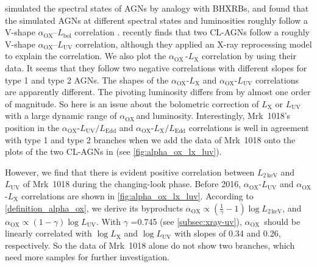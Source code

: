 \documentclass[twocolumn]{aastex63}
\newcommand{\alphaox}{$\alpha_\mathrm{OX}$}
\begin{document}
\citet{2011MNRAS.413.2259S} simulated the spectral states of AGNs by analogy with BHXRBs, and found that the simulated AGNs at different spectral states and luminosities roughly follow a V-shape \alphaox--$L_\mathrm{bol}$ correlation \citep[see also in ][]{2019ApJ...883...76R}. \citet{2019arXiv190904676R} recently finds that two CL-AGNs follow a roughly V-shape \alphaox--$L_\mathrm{UV}$ correlation, although they applied an X-ray reprocessing model to explain the correlation. We also plot the \alphaox\,-$L_\mathrm{X}$ correlation by using their data. It seems that they follow two negative correlations with different slopes for type 1 and type 2 AGNs. The shapes of the \alphaox-$L_\mathrm{X}$ and \alphaox-$L_\mathrm{UV}$ correlations are apparently different. The pivoting luminosity differs from \citet{2011ApJ...739...64X} by almost one order of magnitude. So here is an issue about the bolometric correction of $L_\mathrm{X}$ or $L_\mathrm{UV}$ with a large dynamic range of \alphaox \,and luminosity. Interestingly, Mrk~1018's position in the \alphaox-$L_\mathrm{UV}/L_\mathrm{Edd}$ and \alphaox-$L_\mathrm{X}/L_\mathrm{Edd}$ correlations is well in agreement with type 1 and type 2 branches when we add the data of Mrk~1018 onto the plots of the two CL-AGNs in \citet{2019arXiv190904676R} (see \autoref{fig:alpha_ox_lx_luv}).

However, we find that there is evident positive correlation between $L_\mathrm{2\,keV}$ and $L_\mathrm{UV}$ of Mrk~1018 during the changing-look phase. Before 2016, \alphaox-$L_\mathrm{UV}$ and \alphaox-$L_\mathrm{X}$ correlations are shown in \autoref{fig:alpha_ox_lx_luv}. According to \autoref{definition_alpha_ox}, we derive its byproducts \alphaox $\propto (\frac{1}{\gamma}-1) \log L_\mathrm{2\,keV}$, and \alphaox $\propto (1-\gamma) \log L_\mathrm{UV}$. With $\gamma$ =0.745 (see \autoref{subsec:xray-uv}), \alphaox\, should be linearly correlated with $\log L_\mathrm{X}$ and $\log L_\mathrm{UV}$ with slopes of 0.34 and 0.26, respectively. So the data of Mrk~1018 alone do not show two branches, which need more samples for further investigation. 




\end{document}
